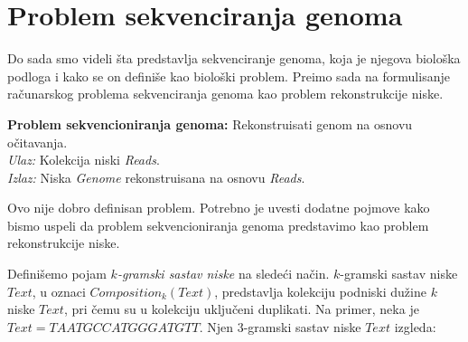 \section{Problem sekvenciranja genoma}

Do sada smo videli \v sta predstavlja sekvenciranje genoma, koja je njegova biolo\v ska podloga i kako se on defini\v se kao biolo\v ski problem. Pre\dj imo sada na formulisanje ra\v cunarskog problema sekvenciranja genoma kao problem rekonstrukcije niske.

\begin{tcolorbox}
	\textbf{Problem sekvencioniranja genoma:} Rekonstruisati genom na osnovu očitavanja. \\
	\textit{Ulaz:} Kolekcija niski \emph{Reads}.\\
	\textit{Izlaz:} Niska \emph{Genome} rekonstruisana na osnovu \emph{Reads}.
\end{tcolorbox}

Ovo nije dobro definisan problem. Potrebno je uvesti dodatne pojmove kako bismo uspeli da problem sekvencioniranja genoma predstavimo kao problem rekonstrukcije niske.

Defini\v semo pojam \emph{$k$-gramski sastav niske} na slede\'ci na\v cin. $k$-gramski sastav niske $Text$, u oznaci $Composition_k(Text)$, predstavlja kolekciju podniski dužine $k$ niske $Text$, pri \v cemu su u kolekciju uključeni duplikati. Na primer, neka je $Text=TAATGCCATGGGATGTT$. Njen $3$-gramski sastav niske $Text$ izgleda:

